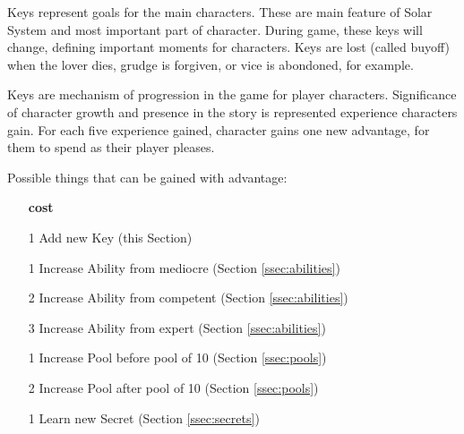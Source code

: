Keys represent goals for the main characters.
These are main feature of Solar System and most important part of character.
During game, these keys will change, defining important moments for characters.
Keys are lost (called buyoff) when the lover dies, grudge is forgiven, or vice is abondoned, for example.

Keys are mechanism of progression in the game for player characters.
Significance of character growth and presence in the story is represented experience characters gain.
For each five experience gained, character gains one new advantage, for them to spend as their player pleases.

Possible things that can be gained with advantage:
\begin{itemize}
\item[\textbf{cost}]
\item[1] Add new Key (this Section)
\item[1] Increase Ability from mediocre (Section \ref{ssec:abilities})
\item[2] Increase Ability from competent (Section \ref{ssec:abilities})
\item[3] Increase Ability from expert (Section \ref{ssec:abilities})
\item[1] Increase Pool before pool of 10 (Section \ref{ssec:pools})
\item[2] Increase Pool after pool of 10 (Section \ref{ssec:pools})
\item[1] Learn new Secret (Section \ref{ssec:secrets})
\end{itemize}

\pagebreak
